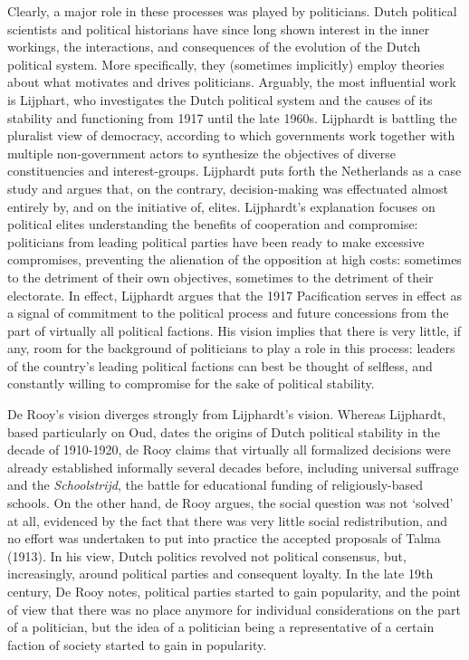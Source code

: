     Clearly, a major role in these processes was played by politicians. Dutch political scientists and political historians have since long shown interest in the inner workings, the interactions, and consequences of the evolution of the Dutch political system. More specifically, they (sometimes implicitly) employ theories about what motivates and drives politicians. Arguably, the most influential work is Lijphart, who investigates the Dutch political system and the causes of its stability and functioning from 1917 until the late 1960s.\autocite{lijphart1975politics} Lijphardt is battling the pluralist view of democracy, according to which governments work together with multiple non-government actors to synthesize the objectives of diverse constituencies and interest-groups. Lijphardt puts forth the Netherlands as a case study and argues that, on the contrary, decision-making was effectuated almost entirely by, and on the initiative of, elites. Lijphardt’s explanation focuses on political elites understanding the benefits of cooperation and compromise: politicians from leading political parties have been ready to make excessive compromises, preventing the alienation of the opposition at high costs: sometimes to the detriment of their own objectives, sometimes to the detriment of their electorate. In effect, Lijphardt argues that the 1917 Pacification serves in effect as a signal of commitment to the political process and future concessions from the part of virtually all political factions. His vision implies that there is very little, if any, room for the background of politicians to play a role in this process: leaders of the country’s leading political factions can best be thought of selfless, and constantly willing to compromise for the sake of political stability.

    De Rooy’s vision diverges strongly from Lijphardt’s vision.\autocite{rooy2014ons} Whereas Lijphardt, based particularly on Oud, dates the origins of Dutch political stability in the decade of 1910-1920, de Rooy claims that virtually all formalized decisions were already established informally several decades before, including universal suffrage and the \textit{Schoolstrijd}, the battle for educational funding of religiously-based schools.\autocite{oud1961honderd} On the other hand, de Rooy argues, the social question was not ‘solved’ at all, evidenced by the fact that there was very little social redistribution, and no effort was undertaken to put into practice the accepted proposals of Talma (1913). In his view, Dutch politics revolved not political consensus, but, increasingly, around political parties and consequent loyalty. In the late 19th century, De Rooy notes, political parties started to gain popularity, and the point of view that there was no place anymore for individual considerations on the part of a politician, but the idea of a politician being a representative of a certain faction of society started to gain in popularity. 

